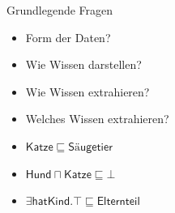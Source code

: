 \documentclass[ngerman]{beamer}
\begin{document}
\begin{frame}

  
  \begin{block}{Grundlegende Fragen}
    \begin{itemize}
    \item<2-> Form der Daten? 
    \item<3-> Wie Wissen darstellen? 
    \item<4-> Wie Wissen extrahieren? 
    \item<5-> Welches Wissen extrahieren? 
    \end{itemize}
  \end{block}


  \begin{Beispiel}
    \begin{itemize}
    \item<9-> $\mathsf{Katze} \sqsubseteq \mathsf{Säugetier}$
    \item<10-> $\mathsf{Hund} \sqcap \mathsf{Katze} \sqsubseteq \bot$
    \item<11-> $\exists \mathsf{hatKind}. \top \sqsubseteq \mathsf{Elternteil}$
    \end{itemize}
  \end{Beispiel}

\end{frame}
\end{document}
